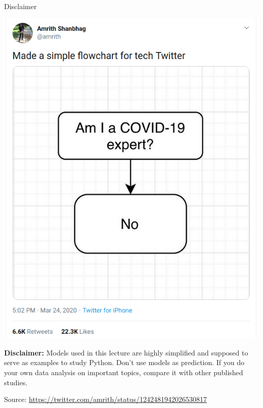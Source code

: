 \begin{frame}[fragile]{Disclaimer}
    \begin{center}
        \includegraphics[height=0.6\textheight]{covid-19-expert.png}
    \end{center}

    \pause
    \textbf{Disclaimer:} Models used in this lecture are highly simplified and supposed to serve as examples
    to study Python. Don't use models as prediction. If you do your own data analysis on important
    topics, compare it with other published studies.

    {\tiny Source: \href{https://twitter.com/amrith/status/1242481942026530817}{https://twitter.com/amrith/status/1242481942026530817}}
\end{frame}

